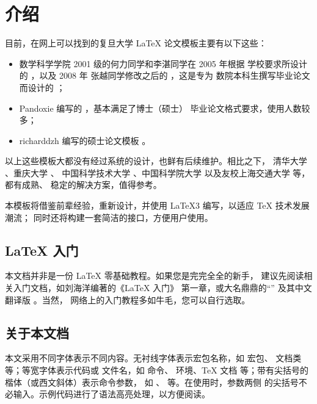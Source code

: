 \documentclass{ccnudoc}
\begin{document}
\section{介绍}

目前，在网上可以找到的复旦大学 \LaTeX{} 论文模板主要有以下这些：
\begin{itemize}
  \item 数学科学学院 2001 级的何力同学和李湛同学在 2005 年根据
    学校要求所设计的 ，以及 2008 年
    张越同学修改之后的 ，这是专为
    数院本科生撰写毕业论文而设计的
    \cite{数院毕业论文格式,数院毕业论文格式更新}；
  \item Pandoxie 编写的 
    \cite{pandoxie2014fduthesislatex}，基本满足了博士（硕士）
    毕业论文格式要求，使用人数较多；
  \item richarddzh 编写的硕士论文模板 
    \cite{richard2016fudanthesis}。
\end{itemize}
以上这些模板大都没有经过系统的设计，也鲜有后续维护。相比之下，
清华大学 \cite{thuthesis}、重庆大学 \cite{cquthesis}、
中国科学技术大学 \cite{ustcthesis}、中国科学院大学 \cite{ucasthesis}
以及友校上海交通大学 \cite{sjtuthesis}等，都有成熟、
稳定的解决方案，值得参考。

本模板将借鉴前辈经验，重新设计，并使用 \LaTeX3
\cite{source3} 编写，以适应 \TeX{} 技术发展潮流；
同时还将构建一套简洁的接口，方便用户使用。

\subsection*{\LaTeX{} 入门}

本文档并非是一份 \LaTeX{} 零基础教程。如果您是完完全全的新手，
建议先阅读相关入门文档，如刘海洋编著的《\LaTeX{} 入门》
\cite{刘海洋2013latex入门} 第一章，或大名鼎鼎的“”
\cite{lshort} 及其中文翻译版 \cite{lshort-zh-cn}。当然，
网络上的入门教程多如牛毛，您可以自行选取。

\subsection*{关于本文档}

本文采用不同字体表示不同内容。无衬线字体表示宏包名称，如
 宏包、 文档类等；等宽字体表示代码或
文件名，如  命令、 环境、\TeX{} 文档
 等；带有尖括号的楷体（或西文斜体）表示命令参数，
如 、 等。在使用时，参数两侧
的尖括号不必输入。示例代码进行了语法高亮处理，以方便阅读。
\end{document}
